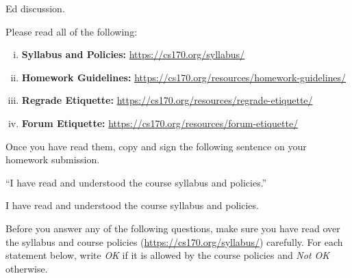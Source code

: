 \documentclass[11pt]{article}
\begin{document}
\begin{subparts}
\begin{solution}
	Ed discussion.
\end{solution}
\subpart Please read all of the following: 

\begin{enumerate}[(i)]
\item \textbf{Syllabus and Policies:} \url{https://cs170.org/syllabus/}
\item \textbf{Homework Guidelines:} \url{https://cs170.org/resources/homework-guidelines/}
\item \textbf{Regrade Etiquette:} \url{https://cs170.org/resources/regrade-etiquette/}
\item \textbf{Forum Etiquette:} \url{https://cs170.org/resources/forum-etiquette/}
\end{enumerate}

Once you have read them, copy and sign the following sentence on your homework submission.

``I have read and understood the course syllabus and policies.''

\begin{solution}
	I have read and understood the course syllabus and policies. 
\end{solution}
\end{subparts}

\pagebreak
{}

Before you answer any of the following questions, make sure you have read over the syllabus and course policies (\url{https://cs170.org/syllabus/}) carefully.
For each statement below, write \textit{OK} if it is allowed by the course policies and \textit{Not OK} otherwise.
\end{document}
